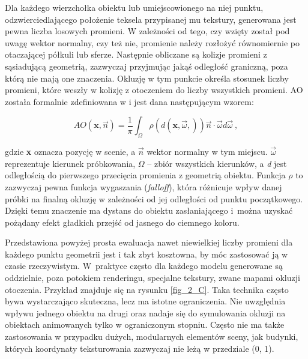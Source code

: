	
	Dla każdego wierzchołka obiektu lub umiejscowionego na niej punktu, odzwierciedlającego położenie teksela przypisanej mu tekstury, generowana jest pewna liczba losowych promieni. W zależności od tego, czy wzięty został pod uwagę wektor normalny, czy też nie, promienie należy rozłożyć równomiernie po otaczającej półkuli lub sferze. Następnie obliczane są kolizje promieni z sąsiadującą geometrią, zazwyczaj przyjmując jakąś odległość graniczną, poza którą nie mają one znaczenia. Okluzję w tym punkcie określa stosunek liczby promieni, które weszły w kolizję z otoczeniem do liczby wszystkich promieni. AO została formalnie zdefiniowana w \cite{sloan} i jest dana następującym wzorem:
	
	\begin{equation}
	\mathit{AO}(\mathbf{x}, \vec{n}) = \frac{1}{\pi}\int_{\Omega}^{}\rho(\mathit{d}(\mathbf{x}, \vec{\omega},))\vec{n}\cdot \vec{\omega}d\vec{\omega}\ ,
	\end{equation}
	
	gdzie \textbf{x} oznacza pozycję w scenie, a \(\vec{n}\) wektor normalny w tym miejscu. \(\vec{\omega}\) reprezentuje kierunek próbkowania, \(\Omega\) -- zbiór wszystkich kierunków, a \textit{d} jest odległością do pierwszego przecięcia promienia z geometrią obiektu. Funkcja \(\rho\) to zazwyczaj pewna funkcja wygaszania (\textit{falloff}), która różnicuje wpływ danej próbki na finalną okluzję w zależności od jej odległości od punktu początkowego. Dzięki temu znaczenie ma dystans do obiektu zasłaniającego i~można uzyskać pożądany efekt gładkich przejść od jasnego do ciemnego koloru.
	
	Przedstawiona powyżej prosta ewaluacja nawet niewielkiej liczby promieni dla każdego punktu geometrii jest i tak zbyt kosztowna, by móc zastosować ją w czasie rzeczywistym. W~praktyce często dla każdego modelu generowane są oddzielnie, poza potokiem renderingu, specjalne tekstury, zwane mapami okluzji otoczenia. Przykład znajduje się na rysunku \ref{fig_2_C}. Taka technika często bywa wystarczająco skuteczna, lecz ma istotne ograniczenia. Nie uwzględnia wpływu jednego obiektu na drugi oraz nadaje się do symulowania okluzji na obiektach animowanych tylko w ograniczonym stopniu. Często nie ma także zastosowania w przypadku dużych, modularnych elementów sceny, jak budynki, których koordynaty teksturowania zazwyczaj nie leżą w przedziale (0, 1).
	
